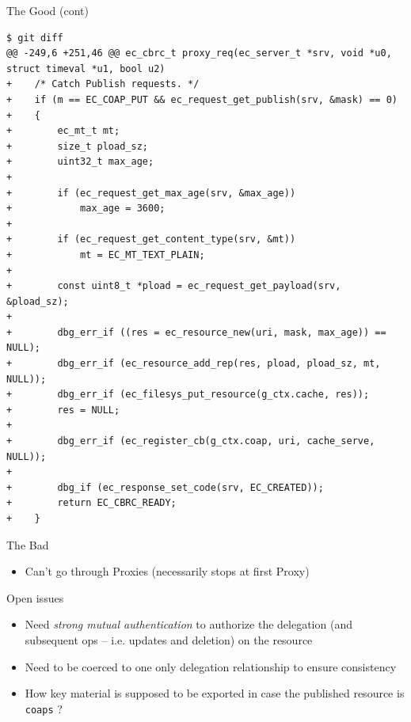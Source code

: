 \documentclass{beamer}
\begin{document}
\begin{frame}[fragile]{The Good (cont)}


{\tiny 
\begin{verbatim}
$ git diff
@@ -249,6 +251,46 @@ ec_cbrc_t proxy_req(ec_server_t *srv, void *u0, struct timeval *u1, bool u2)
+    /* Catch Publish requests. */
+    if (m == EC_COAP_PUT && ec_request_get_publish(srv, &mask) == 0)
+    {
+        ec_mt_t mt;
+        size_t pload_sz;
+        uint32_t max_age;
+
+        if (ec_request_get_max_age(srv, &max_age))
+            max_age = 3600;
+
+        if (ec_request_get_content_type(srv, &mt))
+            mt = EC_MT_TEXT_PLAIN;
+
+        const uint8_t *pload = ec_request_get_payload(srv, &pload_sz);
+
+        dbg_err_if ((res = ec_resource_new(uri, mask, max_age)) == NULL);
+        dbg_err_if (ec_resource_add_rep(res, pload, pload_sz, mt, NULL));
+        dbg_err_if (ec_filesys_put_resource(g_ctx.cache, res));
+        res = NULL;
+
+        dbg_err_if (ec_register_cb(g_ctx.coap, uri, cache_serve, NULL));
+
+        dbg_if (ec_response_set_code(srv, EC_CREATED));
+        return EC_CBRC_READY;        
+    }
\end{verbatim}
}
\end{frame}

\begin{frame}{The Bad}
\begin{itemize}
 \item Can't go through Proxies (necessarily stops at first Proxy)
\end{itemize}
\end{frame}

\begin{frame}{Open issues}

\begin{itemize}
 \item Need \emph{strong mutual authentication} to authorize the delegation (and subsequent ops -- i.e. updates and deletion) on the resource
 \item Need to be coerced to one only delegation relationship to ensure consistency
 \item How key material is supposed to be exported in case the published resource is \texttt{coaps} ?
\end{itemize}

\end{frame}
\end{document}

